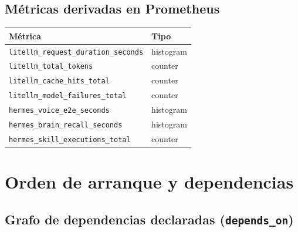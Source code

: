 \documentclass[11pt,a4paper]{article}
\begin{document}
\subsection{Métricas derivadas en Prometheus}

\begin{center}
\begin{tabular}{|l|l|}
\hline
\rowcolor{hermesblue}\color{white}\textbf{Métrica} & \color{white}\textbf{Tipo}\\
\hline
\texttt{litellm\_request\_duration\_seconds} & histogram\\
\texttt{litellm\_total\_tokens} & counter\\
\texttt{litellm\_cache\_hits\_total} & counter\\
\texttt{litellm\_model\_failures\_total} & counter\\
\texttt{hermes\_voice\_e2e\_seconds} & histogram\\
\texttt{hermes\_brain\_recall\_seconds} & histogram\\
\texttt{hermes\_skill\_executions\_total} & counter\\
\hline
\end{tabular}
\end{center}

\newpage

\section{Orden de arranque y dependencias}

\subsection{Grafo de dependencias declaradas (\texttt{depends\_on})}
\end{document}
